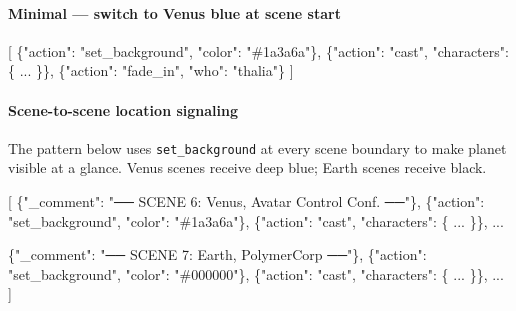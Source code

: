 \documentclass[
  12pt,
  letterpaper,
]{book}
\newenvironment{Shaded}{}{}
\newcommand{\DataTypeTok}[1]{\textcolor[rgb]{0.56,0.13,0.00}{#1}}
\newcommand{\FunctionTok}[1]{\textcolor[rgb]{0.02,0.16,0.49}{#1}}
\newcommand{\OtherTok}[1]{\textcolor[rgb]{0.00,0.44,0.13}{#1}}
\newcommand{\StringTok}[1]{\textcolor[rgb]{0.25,0.44,0.63}{#1}}
\begin{document}
\paragraph{Minimal --- switch to Venus blue at scene
start}\label{set-background-venus}

\begin{Shaded}
\begin{Highlighting}[]
\OtherTok{[}
  \FunctionTok{\{}\DataTypeTok{"action"}\FunctionTok{:} \StringTok{"set\_background"}\FunctionTok{,} \DataTypeTok{"color"}\FunctionTok{:} \StringTok{"\#1a3a6a"}\FunctionTok{\}}\OtherTok{,}
  \FunctionTok{\{}\DataTypeTok{"action"}\FunctionTok{:} \StringTok{"cast"}\FunctionTok{,} \DataTypeTok{"characters"}\FunctionTok{:} \FunctionTok{\{} \OtherTok{...} \FunctionTok{\}\}}\OtherTok{,}
  \FunctionTok{\{}\DataTypeTok{"action"}\FunctionTok{:} \StringTok{"fade\_in"}\FunctionTok{,} \DataTypeTok{"who"}\FunctionTok{:} \StringTok{"thalia"}\FunctionTok{\}}
\OtherTok{]}
\end{Highlighting}
\end{Shaded}

\paragraph{Scene-to-scene location
signaling}\label{set-background-location-signal}

The pattern below uses \texttt{set\_background} at every scene
boundary to make planet visible at a glance. Venus scenes receive
deep blue; Earth scenes receive black.

\begin{Shaded}
\begin{Highlighting}[]
\OtherTok{[}
  \FunctionTok{\{}\DataTypeTok{"\_comment"}\FunctionTok{:} \StringTok{"── SCENE 6: Venus, Avatar Control Conf. ──"}\FunctionTok{\}}\OtherTok{,}
  \FunctionTok{\{}\DataTypeTok{"action"}\FunctionTok{:} \StringTok{"set\_background"}\FunctionTok{,} \DataTypeTok{"color"}\FunctionTok{:} \StringTok{"\#1a3a6a"}\FunctionTok{\}}\OtherTok{,}
  \FunctionTok{\{}\DataTypeTok{"action"}\FunctionTok{:} \StringTok{"cast"}\FunctionTok{,} \DataTypeTok{"characters"}\FunctionTok{:} \FunctionTok{\{} \OtherTok{...} \FunctionTok{\}\}}\OtherTok{,}
  \OtherTok{...}

  \FunctionTok{\{}\DataTypeTok{"\_comment"}\FunctionTok{:} \StringTok{"── SCENE 7: Earth, PolymerCorp ──"}\FunctionTok{\}}\OtherTok{,}
  \FunctionTok{\{}\DataTypeTok{"action"}\FunctionTok{:} \StringTok{"set\_background"}\FunctionTok{,} \DataTypeTok{"color"}\FunctionTok{:} \StringTok{"\#000000"}\FunctionTok{\}}\OtherTok{,}
  \FunctionTok{\{}\DataTypeTok{"action"}\FunctionTok{:} \StringTok{"cast"}\FunctionTok{,} \DataTypeTok{"characters"}\FunctionTok{:} \FunctionTok{\{} \OtherTok{...} \FunctionTok{\}\}}\OtherTok{,}
  \OtherTok{...}
\OtherTok{]}
\end{Highlighting}
\end{Shaded}
\end{document}
